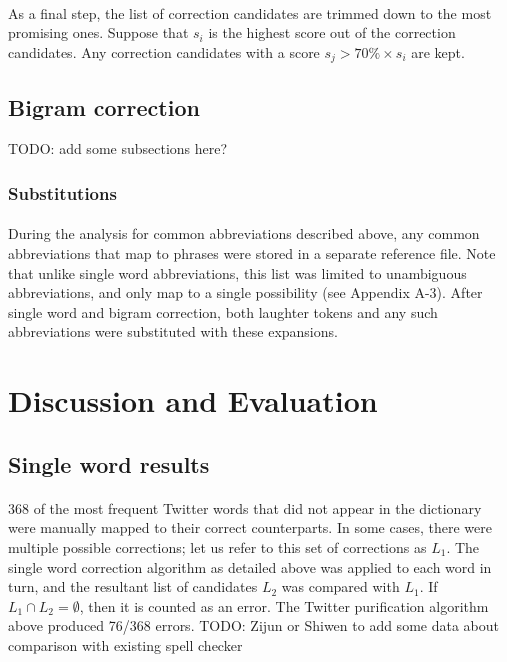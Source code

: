 \documentclass[twocolumn,10pt]{article}
\begin{document}
\paragraph{}As a final step, the list of correction candidates are trimmed down to the most promising ones. Suppose that $s_i$ is the highest score out of the correction candidates. Any correction candidates with a score $s_j > 70\% \times s_i$ are kept.
\subsection*{Bigram correction}
TODO: add some subsections here?
\subsubsection*{Substitutions}
\paragraph{} During the analysis for common abbreviations described above, any common abbreviations that map to phrases were stored in a separate reference file. Note that unlike single word abbreviations, this list was limited to unambiguous abbreviations, and only map to a single possibility (see Appendix A-3). After single word and bigram correction, both laughter tokens and any such abbreviations were substituted with these expansions.
\section*{Discussion and Evaluation}
\subsection*{Single word results}
\paragraph{} 368 of the most frequent Twitter words that did not appear in the dictionary were manually mapped to their correct counterparts. In some cases, there were multiple possible corrections; let us refer to this set of corrections as $L_1$. The single word correction algorithm as detailed above was applied to each word in turn, and the resultant list of candidates $L_2$ was compared with $L_1$. If $L_1\cap L_2 = \emptyset$, then it is counted as an error. The Twitter purification algorithm above produced 76/368 errors.
TODO: Zijun or Shiwen to add some data about comparison with existing spell checker
\end{document}
